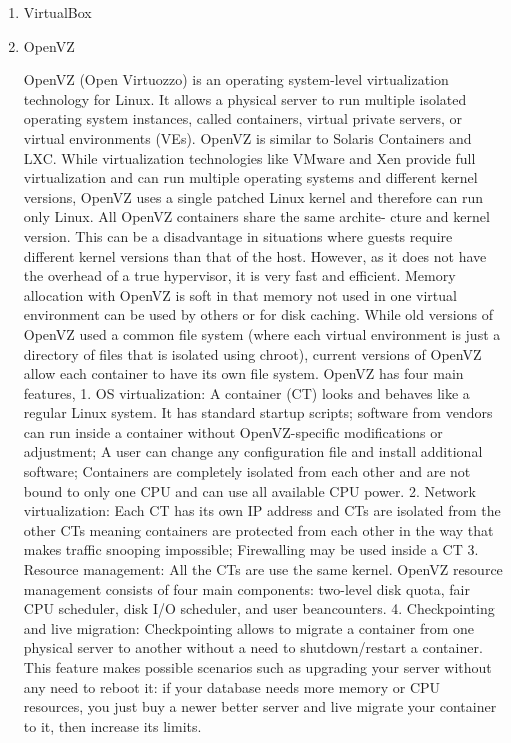 \begin{enumerate}
\item {} 
VirtualBox

\item {} 
OpenVZ

OpenVZ (Open Virtuozzo) is an operating system-level
virtualization technology for Linux. It allows a physical server
to run multiple isolated operating system instances, called
containers, virtual private servers, or virtual environments
(VEs). OpenVZ is similar to Solaris Containers and
LXC. \label{\detokenize{i524/technologies:id627}}{\hyperref[\detokenize{i524/technologies:www-openvz-3}]{\sphinxcrossref{{[}542{]}}}} While virtualization technologies like
VMware and Xen provide full virtualization and can run multiple
operating systems and different kernel versions, OpenVZ uses a
single patched Linux kernel and therefore can run only Linux. All
OpenVZ containers share the same archite- cture and kernel
version. This can be a disadvantage in situations where guests
require different kernel versions than that of the host. However,
as it does not have the overhead of a true hypervisor, it is very
fast and efficient. Memory allocation with OpenVZ is soft in that
memory not used in one virtual environment can be used by others
or for disk caching. \label{\detokenize{i524/technologies:id628}}{\hyperref[\detokenize{i524/technologies:www-openvz-2}]{\sphinxcrossref{{[}543{]}}}} While old versions of
OpenVZ used a common file system (where each virtual environment
is just a directory of files that is isolated using chroot),
current versions of OpenVZ allow each container to have its own
file system.  OpenVZ has four main features, \label{\detokenize{i524/technologies:id629}}{\hyperref[\detokenize{i524/technologies:www-openvz-1}]{\sphinxcrossref{{[}544{]}}}}
1. OS virtualization: A container (CT) looks and behaves like a
regular Linux system. It has standard startup scripts; software
from vendors can run inside a container without OpenVZ-specific
modifications or adjustment; A user can change any configuration
file and install additional software; Containers are completely
isolated from each other and are not bound to only one CPU and
can use all available CPU power.
2. Network virtualization: Each CT has its own IP address and CTs
are isolated from the other CTs meaning containers are protected
from each other in the way that makes traffic snooping
impossible; Firewalling may be used inside a CT
3. Resource management: All the CTs are use the same
kernel. OpenVZ resource management consists of four main
components: two-level disk quota, fair CPU scheduler, disk I/O
scheduler, and user beancounters.
4. Checkpointing and live migration: Checkpointing allows to
migrate a container from one physical server to another without a
need to shutdown/restart a container. This feature makes possible
scenarios such as upgrading your server without any need to
reboot it: if your database needs more memory or CPU resources,
you just buy a newer better server and live migrate your
container to it, then increase its limits.


\end{enumerate}
